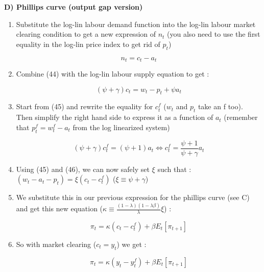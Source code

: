 \documentclass{article}
\begin{document}
\textbf{D) Phillips curve (output gap version)}
\begin{enumerate}
    \item Substitute the log-lin labour demand function into the log-lin labour market clearing condition to get a new expression of $n_t$ (you also need to use the first equality in the log-lin price index to get rid of $p_t$)
    \begin{expectedresultsbox}
    \begin{equation}
        n_t=c_t-a_t
    \end{equation}
    \end{expectedresultsbox}
    \item Combine (44) with the log-lin labour supply equation to get : 
    \begin{expectedresultsbox}
    \begin{equation}
        (\psi + \gamma)c_t=w_t-p_t+\psi a_t
    \end{equation}
    \end{expectedresultsbox}
    \item Start from (45) and rewrite the equality for $c_t^f$ ($w_t$ and $p_t$ take an f too). Then simplify the right hand side to express it as a function of $a_t$ (remember that $p_t^f = w_t^f-a_t$ from the log linearized system)
    \begin{expectedresultsbox}
    \begin{equation}
        (\psi+\gamma)c_t^f = (\psi + 1)a_t \Longleftrightarrow c_t^f = \frac{\psi+1}{\psi + \gamma}a_t
    \end{equation}
    \end{expectedresultsbox}
    \item Using (45) and (46), we can now safely set $\xi$ such that : $(w_t-a_t-p_t) = \xi (c_t-c_t^f)$ ($\xi \equiv \psi+\gamma$)
    \item We substitute this in our previous expression for the phillips curve (see C) and get this new equation ($\kappa\equiv \frac{(1-\lambda)(1-\lambda\beta)}{\lambda}\xi$) : 
    \begin{expectedresultsbox}
    \begin{equation}
        \pi_t = \kappa(c_t-c_t^f)+\beta E_t[\pi_{t+1}]
    \end{equation}   
    \end{expectedresultsbox}
    \item So with market clearing ($c_t = y_t$) we get : 
    \begin{expectedresultsbox}
    \begin{equation}
        \pi_t = \kappa(y_t-y_t^f)+\beta E_t[\pi_{t+1}]
    \end{equation}
    \end{expectedresultsbox}


\end{enumerate}
\end{document}
